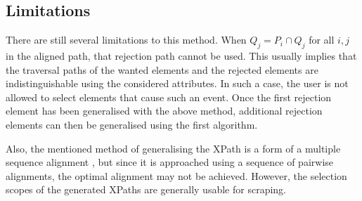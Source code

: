 \subsection{Limitations}
There are still several limitations to this method. When $Q_j = P_i \cap Q_j$ for all $i,j$
in the aligned path, that rejection path cannot be used. This usually implies that the
traversal paths of the wanted elements and the rejected elements are indistinguishable using
the considered attributes. In such a case, the user is not allowed to select elements that
cause such an event. Once the first rejection element has been generalised with the above
method, additional rejection elements can then be generalised using the first algorithm.

Also, the mentioned method of generalising the XPath is a form of a multiple sequence alignment
, but since it is approached using a sequence of pairwise alignments, the optimal alignment may
 not be achieved. However, the selection scopes of the generated XPaths are generally usable
for scraping.


